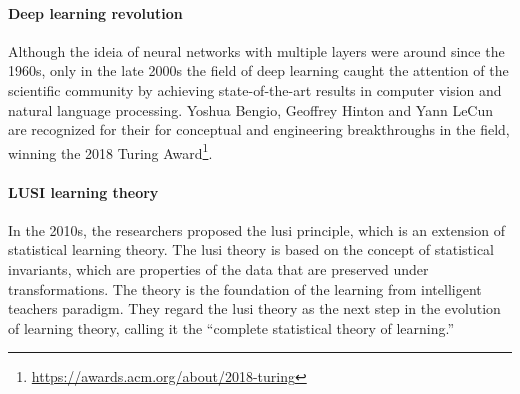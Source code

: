 \paragraph{Deep learning revolution}

Although the ideia of neural networks with multiple layers were around since the 1960s,
only in the late 2000s the field of deep learning caught the attention of the scientific
community by achieving state-of-the-art results in computer vision and natural language
processing.  Yoshua Bengio, Geoffrey
Hinton and Yann LeCun are recognized for their for conceptual and engineering
breakthroughs in the field, winning the 2018 Turing Award\footnote{\url{https://awards.acm.org/about/2018-turing}}.

%

%

\paragraph{LUSI learning theory}

In the 2010s, the researchers \textcite{Vapnik2015} proposed the \gls{lusi}
principle, which is an extension of statistical learning theory.  The \gls{lusi}
theory is based on the concept of statistical invariants, which are properties of
the data that are preserved under transformations.  The theory is the foundation of the
learning from intelligent teachers paradigm.  They regard the \gls{lusi} theory as the
next step in the evolution of learning theory, calling it the ``complete statistical
theory of learning.''


